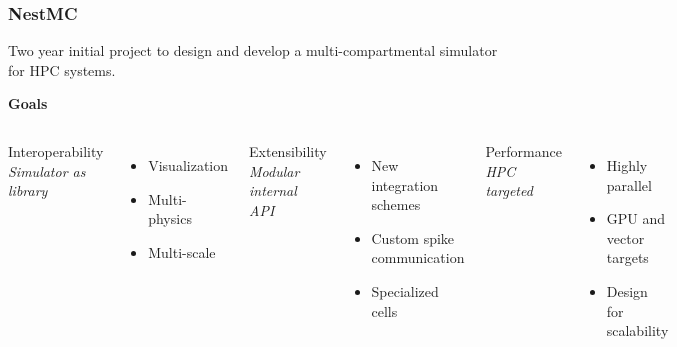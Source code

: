 \documentclass[aspectratio=43,12pt]{beamer}
\newcommand{\nestmc}{NestMC}
\begin{document}
\begin{frame}
\frametitle{\nestmc}
\vspace{2ex}
Two year initial project to design and develop
a multi-compartmental simulator for HPC systems.

\vfill
\begin{center}\bf Goals\end{center}

\vfill
\begin{columns}[t,onlytextwidth]
\centering Interoperability
\\[2ex]
\small
{\em Simulator as library}
\\
\begin{itemize}
\small
\setlength{\itemsep}{0.2ex}
\item Visualization
\item Multi-physics
\item Multi-scale
\end{itemize}

\centering Extensibility
\\[2ex]
\small
{\em Modular internal API}
\\
\begin{itemize}
\small
\setlength{\itemsep}{0.2ex}
\item New integration schemes
\item Custom spike communication
\item Specialized cells
\end{itemize}

\centering Performance
\\[2ex]
\small
{\em HPC targeted}
\begin{itemize}
\small
\setlength{\itemsep}{0.2ex}
\item Highly parallel
\item GPU and vector targets
\item Design for scalability
\end{itemize}

\end{columns}

\vspace{4ex}
\end{frame}
\end{document}
